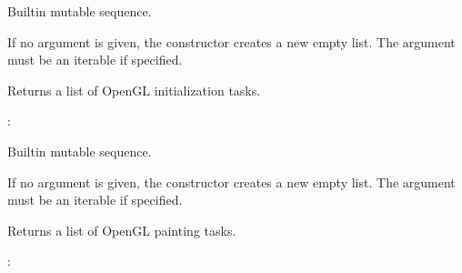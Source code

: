 \documentclass[a4paper,10pt,english,openany,oneside]{sphinxmanual}
\begin{document}
\begin{fulllineitems}
\label{\detokenize{api/utils:picogl.utils.gl_init.init_gl_list}}
\pysigstartsignatures
\pysiglinewithargsret
{}
{}
{}
\pysigstopsignatures
\sphinxAtStartPar
Built\sphinxhyphen{}in mutable sequence.

\sphinxAtStartPar
If no argument is given, the constructor creates a new empty list.
The argument must be an iterable if specified.

\end{fulllineitems}


\sphinxAtStartPar
Returns a list of OpenGL initialization tasks.

\sphinxAtStartPar
{}:

\begin{sphinxVerbatim}[commandchars=\\\{\}]
 

  
\end{sphinxVerbatim}

\begin{fulllineitems}
\label{\detokenize{api/utils:picogl.utils.gl_init.paint_gl_list}}
\pysigstartsignatures
\pysiglinewithargsret
{}
{}
{}
\pysigstopsignatures
\sphinxAtStartPar
Built\sphinxhyphen{}in mutable sequence.

\sphinxAtStartPar
If no argument is given, the constructor creates a new empty list.
The argument must be an iterable if specified.

\end{fulllineitems}


\sphinxAtStartPar
Returns a list of OpenGL painting tasks.

\sphinxAtStartPar
{}:

\begin{sphinxVerbatim}[commandchars=\\\{\}]
 

  
\end{sphinxVerbatim}
\end{document}

